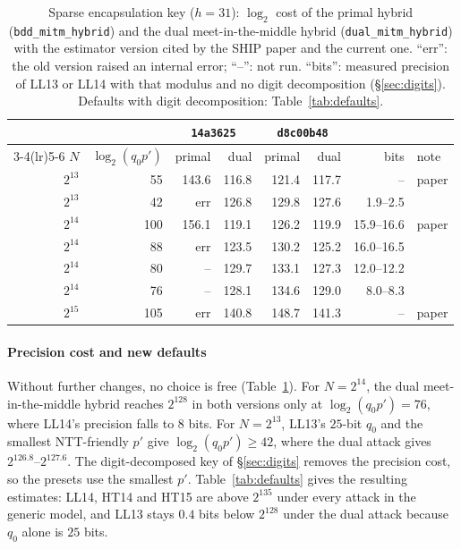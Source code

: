 \documentclass[sigconf,nonacm]{acmart}
\newcommand{\lgqp}{\log_2(q_0 p')}
\begin{document}
\begin{table}[t]
\caption{Sparse encapsulation key ($h=31$): $\log_2$ cost of the primal hybrid (\texttt{bdd\_mitm\_hybrid}) and the dual meet-in-the-middle hybrid (\texttt{dual\_mitm\_hybrid}) with the estimator version cited by the SHIP paper and the current one. ``err'': the old version raised an internal error; ``--'': not run. ``bits'': measured precision of LL13 or LL14 with that modulus and no digit decomposition (\S\ref{sec:digits}). Defaults with digit decomposition: Table~\ref{tab:defaults}.}
\label{tab:sparse}
\small
\setlength{\tabcolsep}{3pt}
\begin{tabular}{rrrrrrrl}
\toprule
 & & \multicolumn{2}{c}{\texttt{14a3625}} & \multicolumn{2}{c}{\texttt{d8c00b48}} & & \\
\cmidrule(lr){3-4}\cmidrule(lr){5-6}
$N$ & $\lgqp$ & primal & dual & primal & dual & bits & note \\
\midrule
$2^{13}$ & 55 & 143.6 & 116.8 & 121.4 & 117.7 & -- & paper \\
$2^{13}$ & 42 & err & 126.8 & 129.8 & 127.6 & 1.9--2.5 & \\
\midrule
$2^{14}$ & 100 & 156.1 & 119.1 & 126.2 & 119.9 & 15.9--16.6 & paper \\
$2^{14}$ & 88 & err & 123.5 & 130.2 & 125.2 & 16.0--16.5 & \\
$2^{14}$ & 80 & -- & 129.7 & 133.1 & 127.3 & 12.0--12.2 & \\
$2^{14}$ & 76 & -- & 128.1 & 134.6 & 129.0 & 8.0--8.3 & \\
\midrule
$2^{15}$ & 105 & err & 140.8 & 148.7 & 141.3 & -- & paper \\
\bottomrule
\end{tabular}
\end{table}

\paragraph{Precision cost and new defaults}
Without further changes, no choice is free (Table~\ref{tab:sparse}).
For $N=2^{14}$, the dual meet-in-the-middle hybrid reaches $2^{128}$ in both versions only at $\lgqp=76$, where LL14's precision falls to $8$ bits.
For $N=2^{13}$, LL13's $25$-bit $q_0$ and the smallest NTT-friendly $p'$ give $\lgqp\ge 42$, where the dual attack gives $2^{126.8}$--$2^{127.6}$.
The digit-decomposed key of \S\ref{sec:digits} removes the precision cost, so the presets use the smallest $p'$.
Table~\ref{tab:defaults} gives the resulting estimates: LL14, HT14 and HT15 are above $2^{135}$ under every attack in the generic model, and LL13 stays $0.4$ bits below $2^{128}$ under the dual attack because $q_0$ alone is $25$ bits.
\end{document}
